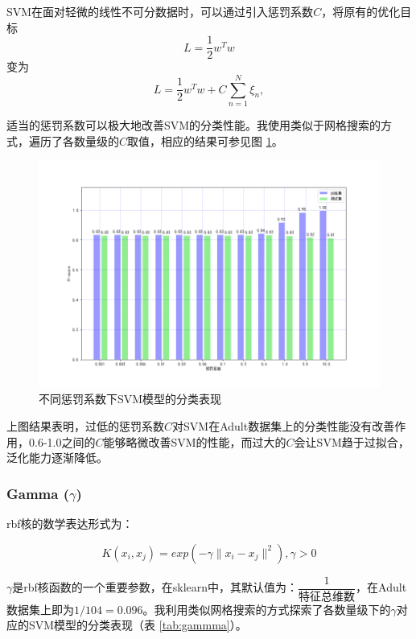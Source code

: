 \documentclass[12pt,a4paper]{article}
\theoremstyle{definition}
\begin{document}
SVM在面对轻微的线性不可分数据时，可以通过引入惩罚系数$C$，将原有的优化目标
\begin{equation}
	L = \dfrac{1}{2}w^Tw
\end{equation}
变为
\begin{equation}
	L = \dfrac{1}{2}w^Tw+C\sum\limits_{n=1}^{N}\xi_n,
\end{equation}

适当的惩罚系数可以极大地改善SVM的分类性能。我使用类似于网格搜索的方式，遍历了各数量级的$C$取值，相应的结果可参见图 \ref{fig:penalty}。

\begin{figure}[H]
	\centering
	\includegraphics[width=0.75\linewidth]{img/svm_penalty.png}
	\caption{不同惩罚系数下SVM模型的分类表现}
	\label{fig:penalty}
\end{figure}

上图结果表明，过低的惩罚系数$C$对SVM在Adult数据集上的分类性能没有改善作用，0.6-1.0之间的$C$能够略微改善SVM的性能，而过大的$C$会让SVM趋于过拟合，泛化能力逐渐降低。

\subsubsection{Gamma ($\gamma$)}

rbf核的数学表达形式为：

\begin{equation}
	K(x_i, x_j)=exp(-\gamma\|x_i-x_j\|^2), \gamma>0
\end{equation}

$\gamma$是rbf核函数的一个重要参数，在sklearn中，其默认值为：$\dfrac{1}{\mbox{特征总维数}}$，在Adult数据集上即为$1/104=0.096$。我利用类似网格搜索的方式探索了各数量级下的$\gamma$对应的SVM模型的分类表现（表 \ref{tab:gammma}）。
\end{document}
